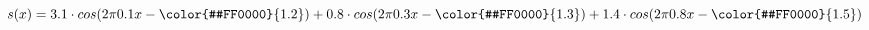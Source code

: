 $s(x) = 3.1 \cdot cos(2\pi 0.1 x - \color{#FF0000}{1.2}) + 0.8 \cdot cos(2\pi 0.3 x - \color{#FF0000}{1.3}) + 1.4 \cdot cos(2\pi 0.8 x - \color{#FF0000}{1.5})$
